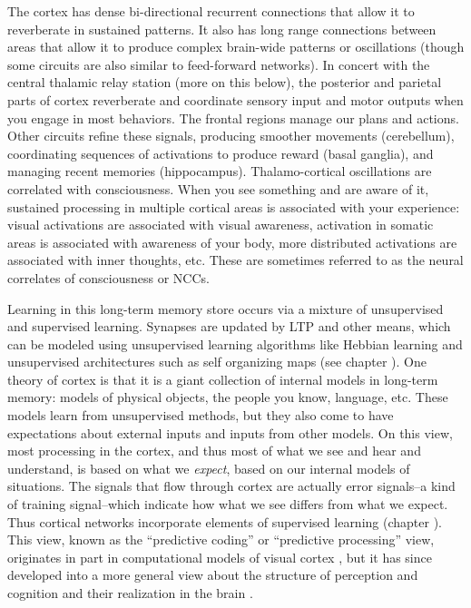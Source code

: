 The cortex has dense bi-directional recurrent connections that allow it to reverberate in sustained patterns. It  also has long range connections between areas that allow it to produce complex brain-wide patterns or oscillations (though some circuits are also similar to feed-forward networks). In concert with the central thalamic relay station (more on this below), the posterior and parietal parts of cortex reverberate and coordinate sensory input and motor outputs when you engage in most behaviors. The frontal regions manage our plans and actions. Other circuits refine these signals, producing smoother movements (cerebellum), coordinating sequences of activations to produce reward (basal ganglia), and managing recent memories (hippocampus). Thalamo-cortical oscillations are correlated with consciousness. When you see something and are aware of it,  sustained processing in multiple cortical areas is  associated with your experience: visual activations are associated with visual awareness, activation in somatic areas is associated with awareness of your body, more distributed activations are associated with inner thoughts, etc. These are sometimes referred to as the neural correlates of consciousness or NCCs.

Learning in this long-term memory store occurs via a mixture of unsupervised and supervised learning. Synapses are updated by LTP and other means,  which can be modeled using unsupervised learning algorithms like Hebbian learning and unsupervised architectures such as self organizing maps (see chapter ). One theory of cortex is that it is a giant collection of internal models in long-term memory: models of physical objects, the people you know, language, etc. These models learn from unsupervised methods, but they also come to have expectations about external inputs and inputs from other models. On this view, most processing in the cortex, and thus most of what we see and hear and understand, is based on what we \emph{expect}, based on our internal models of situations. The signals that flow through cortex are actually error signals--a kind of training signal--which  indicate how what we see differs from what we expect. Thus cortical networks incorporate elements of supervised learning (chapter ). This view, known as the ``predictive coding'' or ``predictive processing'' view, originates in part in computational models of visual cortex \cite{rao1999predictive}, but it has since developed into a more general view about the structure of perception and cognition and their realization in the brain \cite{clark2013whatever}.

